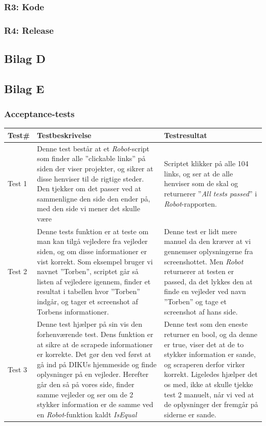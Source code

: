 \documentclass[12pt]{article}
\begin{document}
\subsubsection{R3: Kode}
\subsubsection{R4: Release}
\subsection{Bilag D}

\newpage
\subsection{Bilag E}
\subsubsection*{Acceptance-tests}
\begin{center}
	\begin{tabular}{|p{}|p{}|p{}|}
		\hline
	\textbf{Test\#} & \textbf{Testbeskrivelse} & \textbf{Testresultat} \\ \hline

	Test 1 & Denne test består at et \textit{Robot}-script som finder alle ''clickable links'' på siden der viser projekter, og sikrer at disse henviser til de rigtige steder. Den tjekker om det passer ved at sammenligne den side den ender på, med den side vi mener det skulle være & Scriptet klikker på alle 104 links, og ser at de alle henviser som de skal og returnerer ''\textit{All tests passed}'' i \textit{Robot}-rapporten.  \\ \hline

	Test 2 & Denne tests funktion er at teste om man kan tilgå vejledere fra vejleder siden, og om disse informationer er vist korrekt. Som eksempel bruger vi navnet ''Torben'', scriptet går så listen af vejledere igennem, finder et resultat i tabellen hvor ''Torben'' indgår, og tager et screenshot af Torbens informationer. & Denne test er lidt mere manuel da den kræver at vi gennemser oplysningerne fra screenshottet. Men \textit{Robot} returnerer at testen er passed, da det lykkes den at finde en vejleder ved navn ''Torben'' og tage et screenshot af hans side.\\ \hline

	Test 3 & Denne test hjælper på sin vis den forhenværende test. Dens funktion er at sikre at de scrapede informationer er korrekte. Det gør den ved først at gå ind på DIKUs hjemmeside og finde oplysninger på en vejleder. Herefter går den så på vores side, finder samme vejleder og ser om de 2 stykker information er de samme ved en \textit{Robot}-funktion kaldt \textit{IsEqual} & Denne test som den eneste returner en bool, og da denne er true, viser det at de to stykker information er sande, og scraperen derfor virker korrekt. \newline
	Ligeledes hjælper det os med, ikke at skulle tjekke test 2 manuelt, når vi ved at de oplysninger der fremgår på siderne er sande. \\ \hline
	\end{tabular}
\end{center}
\newpage
\end{document}
